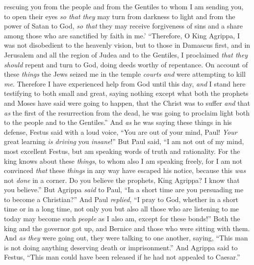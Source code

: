 \begin{biblechapter}
\verse rescuing you from the people and from the Gentiles to whom I am sending you,
\verse to open their eyes \textit{so that they} may turn from darkness to light and from the power of Satan to God, \textit{so that} they may receive forgiveness of sins and a share among those who are sanctified by faith in me.’
\verse “Therefore, O King Agrippa, I was not disobedient to the heavenly vision,
\verse but to those in Damascus first, and in Jerusalem and all the region of Judea and to the Gentiles, I proclaimed \textit{that they should} repent and turn to God, doing deeds worthy of repentance.
\verse On account of these \textit{things} the Jews seized me in the temple \textit{courts} \textit{and} were attempting to kill \textit{me}.
\verse Therefore I have experienced help from God until this day, \textit{and} I stand here testifying to both small and great, saying nothing except what both the prophets and Moses have said were going to happen,
\verse that the Christ was to suffer \textit{and} that \textit{as} the first of the resurrection from the dead, he was going to proclaim light both to the people and to the Gentiles.”
\verse And \textit{as} he was saying these things in his defense, Festus said with a loud voice, “You are out of your mind, Paul! \textit{Your} great learning \textit{is driving} you \textit{insane}!”
\verse But Paul said, “I am not out of my mind, most excellent Festus, but am speaking words of truth and rationality.
\verse For the king knows about these \textit{things}, to whom also I am speaking freely, for I am not convinced \textit{that} these \textit{things} in any way have escaped his notice, because this \textit{was} not \textit{done} in a corner.
\verse Do you believe the prophets, King Agrippa? I know that you believe.”
\verse But Agrippa \textit{said} to Paul, “In a short time are you persuading me to become a Christian?”
\verse And Paul \textit{replied}, “I pray to God, whether in a short time or in a long time, not only you but also all those who are listening to me today may become such \textit{people} as I also am, except for these bonds!”
\verse Both the king and the governor got up, and Bernice and those who were sitting with them.
\verse And \textit{as they} were going out, they were talking to one another, saying, “This man is not doing anything deserving death or imprisonment.”
\verse And Agrippa said to Festus, “This man could have been released if he had not appealed to Caesar.”
\end{biblechapter}

